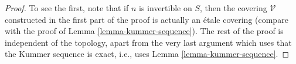 \documentclass[10pt,a4paper]{amsart}
\theoremstyle{plain}
\theoremstyle{definition}
\theoremstyle{remark}
\numberwithin{equation}{subsection}
\begin{document}
\begin{proof}
\medskip\noindent
To see the first, note that if $n$ is invertible on $S$, then the
covering $\mathcal{V}$ constructed in the first part of the proof
is actually an \'etale covering (compare with the proof of
Lemma \ref{lemma-kummer-sequence}). The rest of the proof is independent
of the topology, apart from the very last argument which uses that
the Kummer sequence is exact, i.e., uses Lemma \ref{lemma-kummer-sequence}.
\end{proof}
\end{document}
